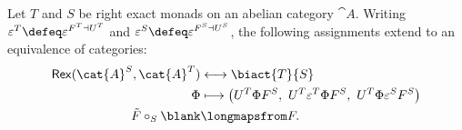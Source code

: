 \begin{proposition}\label{EilenbergWatts}
  Let \(T\) and \(S\) be right exact monads on an abelian category \(\cat{A}\).
  Writing \(\varepsilon^T \defeq \varepsilon^{F^T \dashv U^T}\) and \(\varepsilon^S \defeq \varepsilon^{F^S \dashv U^S}\),
  the following assignments extend to an equivalence of categories:%
  \begin{align*}
    \mathsf{Rex}(\cat{A}^S,\cat{A}^{T}) &\longleftrightarrow \biact{T}{S} \\
    \Phi &\longmapsto \big(
        U^T \Phi F^S,\ %
        U^T \varepsilon^T \Phi F^S,\ %
        U^T \Phi \varepsilon^S F^S
        \big)\\
    \tilde{F} \circ_{S} \blank &\longmapsfrom F.
  \end{align*}
\end{proposition}
